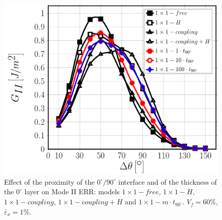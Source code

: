 \documentclass[Review,sagev,times]{sagej}
\begin{document}
\begin{figure}[!htb]
\centering
\includegraphics[height=0.375\textheight]{1x1-i-vf60-GII.pdf}
\caption{Effect of the proximity of the $0^{\circ}/90^{\circ}$ interface and of the thickness of the $0^{\circ}$ layer on Mode II ERR: models $1\times 1-free$, $1\times 1-H$, $1\times 1-coupling$, $1\times 1-coupling+H$ and $1\times 1-m\cdot t_{90^{\circ}}$. $V_{f}=60\%$, $\bar{\varepsilon}_{x}=1\%$.}\label{fig:thicknessGII}
\end{figure}
\end{document}
